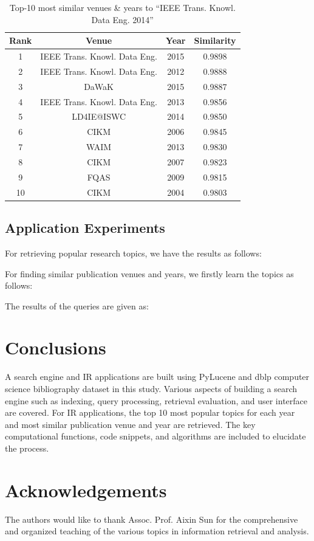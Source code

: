 \documentclass{sig-alternate-05-2015}
\begin{document}
\begin{table}
\centering
\caption{Top-10 most similar venues \& years to ``IEEE Trans. Knowl. Data Eng. 2014''} \label{tbl:app2}
\begin{tabular}{|c|c|c||c|} \hline
Rank & Venue & Year & Similarity\\ \hline
1 & IEEE Trans. Knowl. Data Eng. & 2015 & 0.9898 \\ \hline
2 & IEEE Trans. Knowl. Data Eng. & 2012 & 0.9888 \\ \hline
3 & DaWaK & 2015 & 0.9887 \\ \hline
4 & IEEE Trans. Knowl. Data Eng. & 2013 & 0.9856 \\ \hline
5 & LD4IE@ISWC & 2014 & 0.9850 \\ \hline
6 & CIKM & 2006 & 0.9845 \\ \hline
7 & WAIM & 2013 & 0.9830 \\ \hline
8 & CIKM & 2007 & 0.9823 \\ \hline
9 & FQAS & 2009 & 0.9815 \\ \hline
10 & CIKM & 2004 & 0.9803 \\ \hline
\end{tabular}
\end{table}

\subsection{Application Experiments}
For retrieving popular research topics, we have the results as follows:

For finding similar publication venues and years, we firstly learn the topics as follows:

The results of the queries are given as:
\section{Conclusions} \label{sec:conc}
A search engine and IR applications are built using PyLucene and dblp computer science bibliography dataset in this study. Various aspects of building a search engine such as indexing, query processing, retrieval evaluation, and user interface are covered. For IR applications, the top 10 most popular topics for each year and most similar publication venue and year are retrieved. The key computational functions, code snippets, and algorithms are included to elucidate the process. 

\section{Acknowledgements}
The authors would like to thank Assoc. Prof. Aixin Sun for the comprehensive and organized teaching of the various topics in information retrieval and analysis.
%

%
\end{document}
